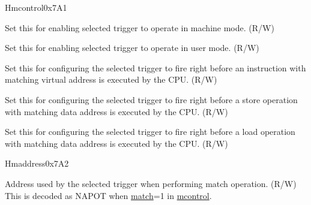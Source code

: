 \begin{register}{H}{mcontrol}{0x7A1}
\begin{regdesc}
\begin{reglist}
\label{fielddesc:MCONTROLM}\item [m] Set this for enabling selected trigger to operate in machine mode. (R/W)
\label{fielddesc:MCONTROLU}\item [u] Set this for enabling selected trigger to operate in user mode. (R/W)
\label{fielddesc:MCONTROLEXECUTE}\item [execute] Set this for configuring the selected trigger to fire right before an instruction with matching virtual address is executed by the CPU. (R/W)
\label{fielddesc:MCONTROLSTORE}\item [store] Set this for configuring the selected trigger to fire right before a store operation with matching data address is executed by the CPU. (R/W)
\label{fielddesc:MCONTROLLOAD}\item [load] Set this for configuring the selected trigger to fire right before a load operation with matching data address is executed by the CPU. (R/W)
\end{reglist}\end{regdesc}
\end{register}

\begin{register}{H}{maddress}{0x7A2}\label{regdesc:MADDRESS}
%
\regnewline%
\begin{regdesc}\begin{reglist}
\label{fielddesc:MADDRESS}\item [maddress] Address used by the selected trigger when performing match operation. (R/W) \newline This is decoded as NAPOT when \hyperref[fielddesc:MCONTROLMATCH]{match}=1 in \hyperref[regdesc:MCONTROL]{mcontrol}.
\end{reglist}\end{regdesc}
\end{register}

